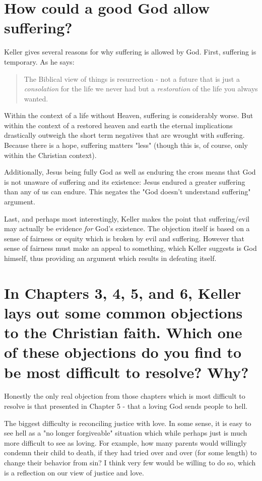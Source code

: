 \documentclass[12pt]{turabian-researchpaper}
\begin{document}
\section{How could a good God allow suffering?}

Keller gives several reasons for why suffering is allowed by God. First, suffering is temporary. As he says\autocite[pg.32]{keller2008reason}:

\begin{quote}
The Biblical view of things is resurrection - not a future that is just a \textit{consolation} for the life we never had but a \textit{restoration} of the life you always wanted.
\end{quote}

Within the context of a life without Heaven, suffering is considerably worse. But within the context of a restored heaven and earth the eternal implications drastically outweigh the short term negatives that are wrought with suffering. Because there is a hope, suffering matters "less" (though this is, of course, only within the Christian context).

Additionally, Jesus being fully God as well as enduring the cross means that God is not unaware of suffering and its existence: Jesus endured a greater suffering than any of us can endure. This negates the "God doesn't understand suffering" argument.

Last, and perhaps most interestingly, Keller makes the point that suffering/evil may actually be evidence \textit{for} God's existence.\autocite[pg.25]{keller2008reason} The objection itself is based on a sense of fairness or equity which is broken by evil and suffering. However that sense of fairness must make an appeal to something, which Keller suggests is God himself, thus providing an argument which results in defeating itself.

\section{In Chapters 3, 4, 5, and 6, Keller lays out some common objections to the Christian faith. Which one of these objections do you find to be most difficult to resolve? Why?}

Honestly the only real objection from those chapters which is most difficult to resolve is that presented in Chapter 5 - that a loving God sends people to hell.

The biggest difficulty is reconciling justice with love. In some sense, it is easy to see hell as a "no longer forgiveable" situation which while perhaps just is much more difficult to see as loving. For example, how many parents would willingly condemn their child to death, if they had tried over and over (for some length) to change their behavior from sin? I think very few would be willing to do so, which is a reflection on our view of justice and love.
\end{document}
